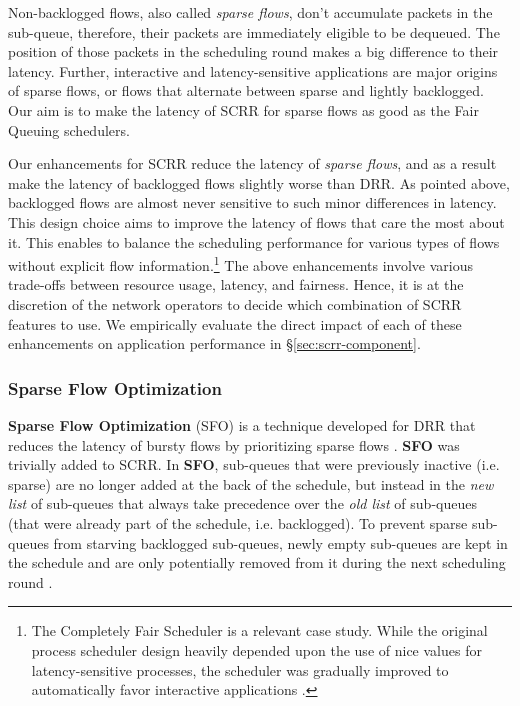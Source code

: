 Non-backlogged flows, also called \textit{sparse flows}, don't
accumulate packets in the sub-queue, therefore, their packets are immediately
eligible to be dequeued. The position of those packets in the
scheduling round makes a big difference to their latency. Further,
interactive and latency-sensitive applications are major origins of sparse flows, or flows that alternate between sparse and lightly backlogged. Our
aim is to make the latency of SCRR for sparse flows as good as the Fair Queuing schedulers.

Our enhancements for SCRR reduce the latency of \textit{sparse flows},
and as a result make the latency of backlogged flows slightly worse
than DRR. As pointed above, backlogged flows are almost never
sensitive to such minor differences in latency. This design choice aims
to improve the latency of flows that care the most about it. This
enables to balance the scheduling performance for various 
types of flows without explicit flow information.\footnote{The
Completely Fair Scheduler is a relevant case study. While the original
process scheduler design heavily depended upon the use of nice values
for latency-sensitive processes, the scheduler was gradually improved
to automatically favor interactive applications \cite{battle}.} The
above enhancements involve various trade-offs between resource usage,
latency, and fairness. Hence, it is at the discretion of the network operators to decide which combination of SCRR features to use. We empirically
evaluate the direct impact of each of these enhancements on
application performance in \S\ref{sec:scrr-component}.

\subsubsection{Sparse Flow Optimization}
\label{sub:sfo}

\textbf{Sparse Flow Optimization} (SFO) is a technique developed for
DRR that reduces the latency of bursty flows by prioritizing sparse
flows \cite{sfo}. \textbf{SFO} was trivially added to SCRR. In
\textbf{SFO}, sub-queues that were previously inactive (i.e. sparse)
are no longer added at the back of the schedule, but instead in the
\textit{new list} of sub-queues that always take precedence over the
\textit{old list} of sub-queues (that were already part of the
schedule, i.e. backlogged). To prevent sparse sub-queues from starving
backlogged sub-queues, newly empty sub-queues are kept in the schedule
and are only potentially removed from it during the next scheduling round
\cite{formal}.

